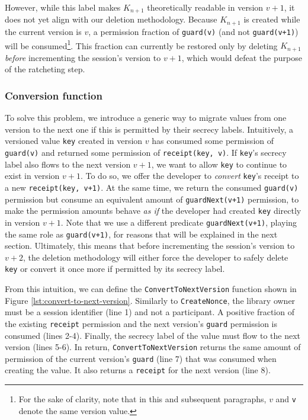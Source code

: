 However, while this label makes $K_{n+1}$ theoretically readable in version $v+1$, it does not yet align with our deletion methodology. Because $K_{n+1}$ is created while the current version is $v$, a permission fraction of \texttt{guard(v)} (and not \texttt{guard(v+1)}) will be consumed\footnote{For the sake of clarity, note that in this and subsequent paragraphs, $v$ and \texttt{v} denote the same version value.}. This fraction can currently be restored only by deleting $K_{n+1}$ \emph{before} incrementing the session's version to $v+1$, which would defeat the purpose of the ratcheting step.

\subsubsection{Conversion function}
\label{sec:conversion-function}

To solve this problem, we introduce a generic way to migrate values from one version to the next one if this is permitted by their secrecy labels.
Intuitively, a versioned value \texttt{key} created in version $v$ has consumed some permission of \texttt{guard(v)} and returned some permission of \texttt{receipt(key, v)}.
If \texttt{key}'s secrecy label also flows to the next version $v+1$, we want to allow \texttt{key} to continue to exist in version $v+1$.
To do so, we offer the developer to \emph{convert} \texttt{key}'s receipt to a new \texttt{receipt(key, v+1)}. At the same time, we return the consumed \texttt{guard(v)} permission but consume an equivalent amount of \texttt{guardNext(v+1)} permission, to make the permission amounts behave \emph{as if} the developer had created \texttt{key} directly in version $v+1$.
Note that we use a different predicate \texttt{guardNext(v+1)}, playing the same role as \texttt{guard(v+1)}, for reasons that will be explained in the next section.
Ultimately, this means that before incrementing the session's version to $v+2$, the deletion methodology will either force the developer to safely delete \texttt{key} or convert it once more if permitted by its secrecy label.

From this intuition, we can define the \texttt{ConvertToNextVersion} function shown in Figure \ref{lst:convert-to-next-version}.
Similarly to \texttt{CreateNonce}, the library owner must be a session identifier (line 1) and not a participant. A positive fraction of the existing \texttt{receipt} permission and the next version's \texttt{guard} permission is consumed (lines 2-4). Finally, the secrecy label of the value must flow to the next version (lines 5-6).
In return, \texttt{ConvertToNextVersion} returns the same amount of permission of the current version's \texttt{guard} (line 7) that was consumed when creating the value. It also returns a \texttt{receipt} for the next version (line 8).

